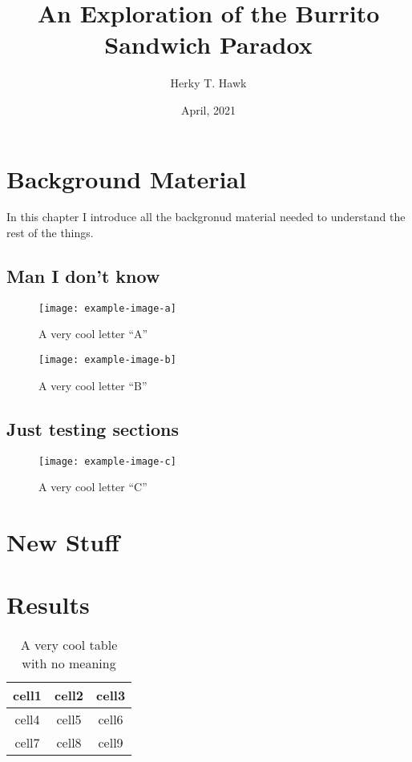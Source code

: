 \documentclass[openany, 10pt]{uithesis}
\title{An Exploration of the Burrito Sandwich Paradox}
\author{Herky T. Hawk}
\date{April, 2021}
\begin{document}
\titlepage

\copyrightPage

\frontmatter


\begin{publicAbstract}
  \lipsum[1-2]
\end{publicAbstract}

\begin{abstract}
  \lipsum[1-2]
\end{abstract}

\tableofcontents*

\listoffigures

\listoftables

\mainmatter

\chapter{Background Material}


In this chapter I introduce all the backgronud material needed to understand the
rest of the things.

\section{Man I don't know}
\begin{figure}
  \centering
  \label{fig:one}
  \caption{A very cool letter ``A''}
\texttt{[image: example-image-a]}
\end{figure}
\lipsum[1-5]
\begin{figure}
  \centering
  \label{fig:two}
  \caption{A very cool letter ``B''}
\texttt{[image: example-image-b]}
\end{figure}
\lipsum[5-10]


\section{Just testing sections}
\begin{figure}
  \centering
  \label{fig:three}
  \caption{A very cool letter ``C''}
\texttt{[image: example-image-c]}
\end{figure}
\lipsum[11-20]

\chapter{New Stuff}
\lipsum[21-40]

\chapter{Results}
\begin{table}
  \centering
  \label{table:one}
\begin{tabular}{ c c c }
 cell1 & cell2 & cell3 \\ \hline
 cell4 & cell5 & cell6 \\ \hline
 cell7 & cell8 & cell9    
\end{tabular}
  \caption{A very cool table with no meaning}
\end{table}
\lipsum[41-60]

\backmatter

\printbibliography
\end{document}
